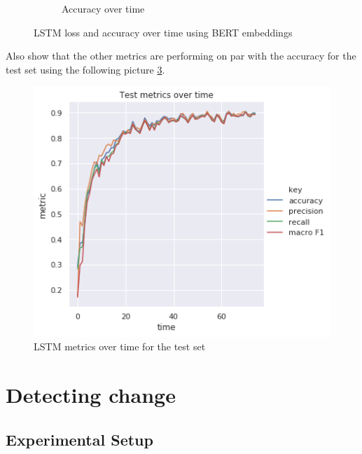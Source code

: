 \documentclass[12pt]{extreport}
\begin{document}
\begin{figure}[H]
\begin{subfigure}{.5\textwidth}
  \caption{Accuracy over time}
  \label{fig:lstm-acc}
\end{subfigure}
\caption{LSTM loss and accuracy over time using BERT embeddings}
\label{fig:lstm-loss-acc}
\end{figure}

Also show that the other metrics are performing on par with the accuracy for the test set using the following picture \ref{fig:lstm-metrics}.

\begin{figure}[H]
\centering
\includegraphics[width=0.8\linewidth]{assets/framework/lstm_BERT_test_metrics_holdout.png}
\caption{LSTM metrics over time for the test set}
\label{fig:lstm-metrics}
\end{figure}

\chapter{Detecting change}

\section{Experimental Setup}
\end{document}
